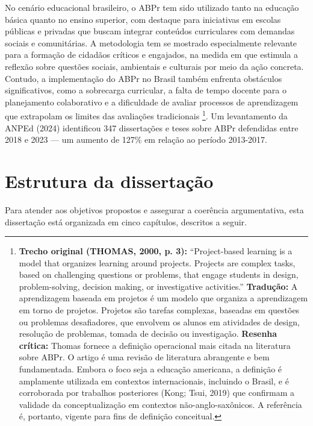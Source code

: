 No cenário educacional brasileiro, o ABPr tem sido utilizado tanto na educação básica quanto no ensino superior, com destaque para iniciativas em escolas públicas e privadas que buscam integrar conteúdos curriculares com demandas sociais e comunitárias. A metodologia tem se mostrado especialmente relevante para a formação de cidadãos críticos e engajados, na medida em que estimula a reflexão sobre questões sociais, ambientais e culturais por meio da ação concreta. Contudo, a implementação do ABPr no Brasil também enfrenta obstáculos significativos, como a sobrecarga curricular, a falta de tempo docente para o planejamento colaborativo e a dificuldade de avaliar processos de aprendizagem que extrapolam os limites das avaliações tradicionais \cite{THOMAS2000}\footnote{\textbf{Trecho original (THOMAS, 2000, p. 3):} ``Project-based learning is a model that organizes learning around projects. Projects are complex tasks, based on challenging questions or problems, that engage students in design, problem-solving, decision making, or investigative activities.'' \textbf{Tradução:} A aprendizagem baseada em projetos é um modelo que organiza a aprendizagem em torno de projetos. Projetos são tarefas complexas, baseadas em questões ou problemas desafiadores, que envolvem os alunos em atividades de design, resolução de problemas, tomada de decisão ou investigação. \textbf{Resenha crítica:} Thomas fornece a definição operacional mais citada na literatura sobre ABPr. O artigo é uma revisão de literatura abrangente e bem fundamentada. Embora o foco seja a educação americana, a definição é amplamente utilizada em contextos internacionais, incluindo o Brasil, e é corroborada por trabalhos posteriores (Kong; Tsui, 2019) que confirmam a validade da conceptualização em contextos não-anglo-saxônicos. A referência é, portanto, vigente para fins de definição conceitual.}. Um levantamento da ANPEd (2024) identificou 347 dissertações e teses sobre ABPr defendidas entre 2018 e 2023 — um aumento de 127\% em relação ao período 2013-2017.

\section{Estrutura da dissertação}
\label{sec:estrutura_dissertacao}

Para atender aos objetivos propostos e assegurar a coerência argumentativa, esta dissertação está organizada em cinco capítulos, descritos a seguir.

